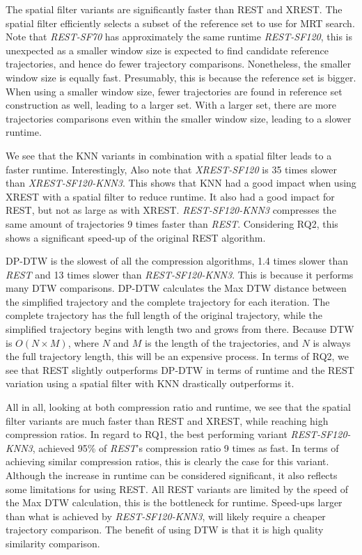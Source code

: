 The spatial filter variants are significantly faster than REST and XREST. The spatial filter efficiently selects a subset of the reference set to use for MRT search. Note that \textit{REST-SF70} has approximately the same runtime \textit{REST-SF120}, this is unexpected as a smaller window size is expected to find candidate reference trajectories, and hence do fewer trajectory comparisons. Nonetheless, the smaller window size is equally fast. Presumably, this is because the reference set is bigger. When using a smaller window size, fewer trajectories are found in reference set construction as well, leading to a larger set. With a larger set, there are more trajectories comparisons even within the smaller window size, leading to a slower runtime.

We see that the KNN variants in combination with a spatial filter leads to a faster runtime. Interestingly, Also note that \textit{XREST-SF120} is 35 times slower than \textit{XREST-SF120-KNN3}. This shows that KNN had a good impact when using XREST with a spatial filter to reduce runtime. It also had a good impact for REST, but not as large as with XREST. \textit{REST-SF120-KNN3} compresses the same amount of trajectories 9 times faster than \textit{REST}. Considering RQ2, this shows a significant speed-up of the original REST algorithm.

DP-DTW is the slowest of all the compression algorithms, 1.4 times slower than \textit{REST} and 13 times slower than \textit{REST-SF120-KNN3}. This is because it performs many DTW comparisons. DP-DTW calculates the Max DTW distance between the simplified trajectory and the complete trajectory for each iteration. The complete trajectory has the full length of the original trajectory, while the simplified trajectory begins with length two and grows from there. Because DTW is $O(N \times M)$, where $N$ and $M$ is the length of the trajectories, and $N$ is always the full trajectory length, this will be an expensive process. In terms of RQ2, we see that REST slightly outperforms DP-DTW in terms of runtime and the REST variation using a spatial filter with KNN drastically outperforms it.

All in all, looking at both compression ratio and runtime, we see that the spatial filter variants are much faster than REST and XREST, while reaching high compression ratios. In regard to RQ1, the best performing variant \textit{REST-SF120-KNN3}, achieved 95\% of \textit{REST}'s compression ratio 9 times as fast. In terms of achieving similar compression ratios, this is clearly the case for this variant. Although the increase in runtime can be considered significant, it also reflects some limitations for using REST. All REST variants are limited by the speed of the Max DTW calculation, this is the bottleneck for runtime. Speed-ups larger than what is achieved by \textit{REST-SF120-KNN3}, will likely require a cheaper trajectory comparison. The benefit of using DTW is that it is high quality similarity comparison.

